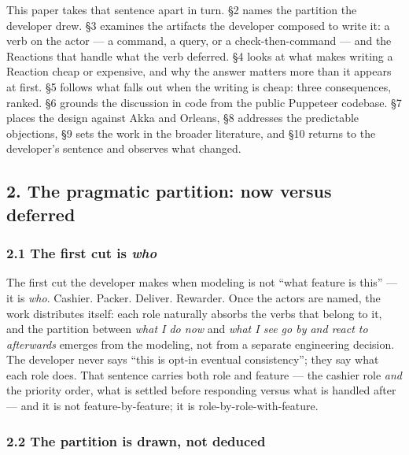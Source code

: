 \documentclass[
]{article}
\begin{document}
This paper takes that sentence apart in turn. §2 names the partition the
developer drew. §3 examines the artifacts the developer composed to
write it: a verb on the actor --- a command, a query, or a
check-then-command --- and the Reactions that handle what the verb
deferred. §4 looks at what makes writing a Reaction cheap or expensive,
and why the answer matters more than it appears at first. §5 follows
what falls out when the writing is cheap: three consequences, ranked. §6
grounds the discussion in code from the public Puppeteer codebase. §7
places the design against Akka and Orleans, §8 addresses the predictable
objections, §9 sets the work in the broader literature, and §10 returns
to the developer's sentence and observes what changed.

\subsection{2. The pragmatic partition: now versus
deferred}\label{the-pragmatic-partition-now-versus-deferred}

\subsubsection{\texorpdfstring{2.1 The first cut is
\emph{who}}{2.1 The first cut is who}}\label{the-first-cut-is-who}

The first cut the developer makes when modeling is not ``what feature is
this'' --- it is \emph{who}. Cashier. Packer. Deliver. Rewarder. Once
the actors are named, the work distributes itself: each role naturally
absorbs the verbs that belong to it, and the partition between
\emph{what I do now} and \emph{what I see go by and react to afterwards}
emerges from the modeling, not from a separate engineering decision. The
developer never says ``this is opt-in eventual consistency''; they say
what each role does. That sentence carries both role and feature --- the
cashier role \emph{and} the priority order, what is settled before
responding versus what is handled after --- and it is not
feature-by-feature; it is role-by-role-with-feature.

\subsubsection{2.2 The partition is drawn, not
deduced}\label{the-partition-is-drawn-not-deduced}
\end{document}
